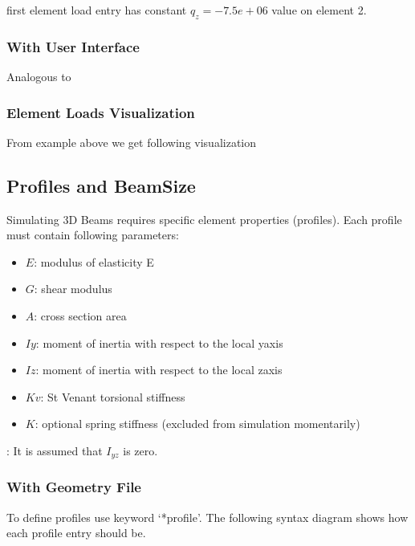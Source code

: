 \documentclass[letterpaper,10pt,english]{sphinxmanual}
\begin{document}
first element load entry has constant \(q_z=-7.5e+06\) value on element 2.


\subsubsection{With User Interface}
\label{\detokenize{making_a_model:id18}}
Analogous to {\hyperref[\detokenize{making_a_model:nodes-input}]{}}


\subsubsection{Element Loads Visualization}
\label{\detokenize{making_a_model:element-loads-visualization}}
From example above we get following visualization

\noindent{}


\subsection{Profiles and BeamSize}
\label{\detokenize{making_a_model:profiles-and-beamsize}}
Simulating 3D Beams requires specific element properties (profiles). Each profile must contain following parameters:
\begin{itemize}
\item {} 
\(E\): modulus of elasticity E

\item {} 
\(G\): shear modulus

\item {} 
\(A\): cross section area

\item {} 
\(Iy\): moment of inertia with respect to the local y\sphinxhyphen{}axis

\item {} 
\(Iz\): moment of inertia with respect to the local z\sphinxhyphen{}axis

\item {} 
\(Kv\): St Venant torsional stiffness

\item {} 
\(K\): optional spring stiffness (excluded from simulation momentarily)

\end{itemize}

: It is assumed that \(I_{yz}\) is zero.


\subsubsection{With Geometry File}
\label{\detokenize{making_a_model:id19}}
To define profiles use keyword ‘*profile’.
The following syntax diagram shows how each profile entry should be.
\end{document}
